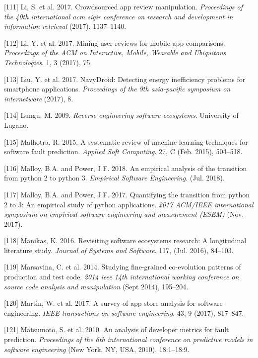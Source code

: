\documentclass[]{book}
\begin{document}
\hypertarget{ref-i2017crowdsourced}{}
{[}111{]} Li, S. et al. 2017. Crowdsourced app review manipulation.
\emph{Proceedings of the 40th international acm sigir conference on
research and development in information retrieval} (2017), 1137--1140.

\hypertarget{ref-li2017mining}{}
{[}112{]} Li, Y. et al. 2017. Mining user reviews for mobile app
comparisons. \emph{Proceedings of the ACM on Interactive, Mobile,
Wearable and Ubiquitous Technologies}. 1, 3 (2017), 75.

\hypertarget{ref-LWXM2017}{}
{[}113{]} Liu, Y. et al. 2017. NavyDroid: Detecting energy inefficiency
problems for smartphone applications. \emph{Proceedings of the 9th
asia-pacific symposium on internetware} (2017), 8.

\hypertarget{ref-Lungu2009}{}
{[}114{]} Lungu, M. 2009. \emph{Reverse engineering software
ecosystems}. University of Lugano.

\hypertarget{ref-Malhotra2015}{}
{[}115{]} Malhotra, R. 2015. A systematic review of machine learning
techniques for software fault prediction. \emph{Applied Soft Computing}.
27, C (Feb. 2015), 504--518.

\hypertarget{ref-Malloy2018}{}
{[}116{]} Malloy, B.A. and Power, J.F. 2018. An empirical analysis of
the transition from python 2 to python 3. \emph{Empirical Software
Engineering}. (Jul. 2018).

\hypertarget{ref-Malloy2017}{}
{[}117{]} Malloy, B.A. and Power, J.F. 2017. Quantifying the transition
from python 2 to 3: An empirical study of python applications.
\emph{2017 ACM/IEEE international symposium on empirical software
engineering and measurement (ESEM)} (Nov. 2017).

\hypertarget{ref-Manikas2016}{}
{[}118{]} Manikas, K. 2016. Revisiting software ecosystems research: A
longitudinal literature study. \emph{Journal of Systems and Software}.
117, (Jul. 2016), 84--103.

\hypertarget{ref-marsavina2014}{}
{[}119{]} Marsavina, C. et al. 2014. Studying fine-grained co-evolution
patterns of production and test code. \emph{2014 ieee 14th international
working conference on source code analysis and manipulation} (Sept
2014), 195--204.

\hypertarget{ref-martin2015survey}{}
{[}120{]} Martin, W. et al. 2017. A survey of app store analysis for
software engineering. \emph{IEEE transactions on software engineering}.
43, 9 (2017), 817--847.

\hypertarget{ref-Matsumoto2010}{}
{[}121{]} Matsumoto, S. et al. 2010. An analysis of developer metrics
for fault prediction. \emph{Proceedings of the 6th international
conference on predictive models in software engineering} (New York, NY,
USA, 2010), 18:1--18:9.
\end{document}
